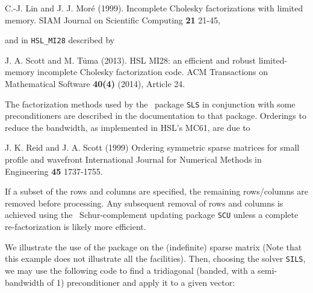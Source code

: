 \documentclass{galahad}
\begin{document}
\noindent
C.-J. Lin and J. J. Mor\'{e} (1999).
Incomplete Cholesky factorizations with limited memory.
SIAM Journal on Scientific Computing {\bf 21} 21-45,

\noindent
and in {\tt HSL\_MI28} described by
\vspace*{1mm}

\noindent
J. A. Scott and M. T\.{u}ma (2013). HSL MI28: an efficient and robust 
limited-memory incomplete Cholesky factorization code. 
ACM Transactions on Mathematical Software {\bf 40(4)} (2014), Article 24.

The factorization methods used by the \libraryname\ package {\tt SLS} in
conjunction with some preconditioners
are described in the documentation to that package. Orderings to reduce the
bandwidth, as implemented in HSL's MC61, are due to
\vspace*{1mm}

\noindent
J. K. Reid and J. A. Scott (1999)
Ordering symmetric sparse matrices for small profile and wavefront
International Journal for Numerical Methods in Engineering {\bf 45} 1737-1755.

If a subset of the rows and columns are specified, the remaining rows/columns
are removed before processing. Any subsequent removal of rows and columns
is achieved using the \libraryname\ Schur-complement updating package {\tt SCU}
unless a complete re-factorization is likely more efficient.


\galexample
We illustrate the use of the package on the (indefinite) sparse matrix
(Note that this example does not illustrate all the facilities).
Then, choosing the solver {\tt SILS}, we may use the following code
to find a tridiagonal (banded, with a semi-bandwidth of 1) preconditioner 
and apply it to a given vector:
\end{document}
